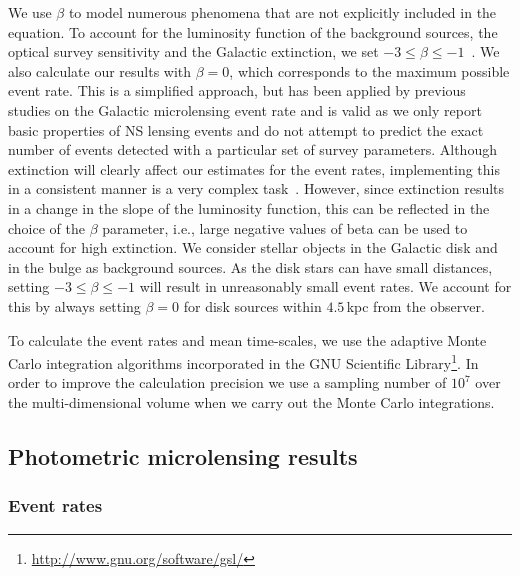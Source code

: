 \documentclass[iop,apj]{emulateapj}
\begin{document}
We use $\beta$ to model numerous phenomena that are not explicitly included in the 
equation. To account for the luminosity function of the background sources, the optical 
survey sensitivity and the Galactic extinction, we set $-3\leq\beta\leq-1$~\citep{kiraga}. 
We also calculate our results with $\beta=0$, which corresponds to the maximum possible 
event rate. This is a simplified approach, but has been applied by previous studies on 
the Galactic microlensing event rate and is valid as we only report basic properties of 
NS lensing events and do not attempt to predict the exact number of events detected with 
a particular set of survey parameters. 
%
Although extinction will clearly affect our estimates for the event rates, implementing 
this in a consistent manner is a very complex task~\citep[see, for example,][]{kerins}. 
However, since extinction results in a change in the slope of the luminosity function, 
this can be reflected in the choice of the $\beta$ parameter, i.e., large negative values of 
beta can be used to account for high extinction.
%
We consider stellar objects in the Galactic disk and in the bulge as background sources. 
As the disk stars can have small distances, setting $-3\leq\beta\leq-1$ will result in 
unreasonably small event rates. We account for this by always setting $\beta = 0$ for 
disk sources within $4.5$\,kpc from the observer.
%

To calculate the event rates and mean time-scales, we use the adaptive Monte Carlo 
integration algorithms incorporated in the GNU Scientific Library\footnote{\url{http://www.gnu.org/software/gsl/}}.
%
In order to improve the calculation precision we use a 
sampling number of $10^{7}$ over the multi-dimensional volume when we 
carry out the Monte Carlo integrations.
%

\subsection{Photometric microlensing results}

\subsubsection{Event rates}
\end{document}
